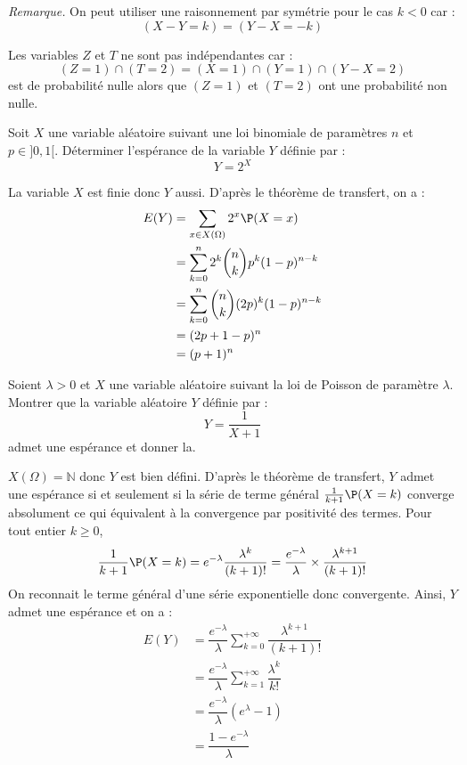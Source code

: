 \documentclass[a4paper,10pt]{report}
\begin{document}
\medskip

\noindent \textit{Remarque.} On peut utiliser une raisonnement par symétrie pour le cas $k <0$ car :
$$ (X-Y=k) = (Y-X=-k)$$

\medskip

\noindent Les variables $Z$ et $T$ ne sont pas indépendantes car :
$$ (Z=1) \cap (T=2) = (X =1) \cap (Y = 1) \cap (Y-X =2)$$
est de probabilité nulle alors que $(Z=1)$ et $(T=2)$ ont une probabilité non nulle.


\begin{Exa} Soit $X$ une variable aléatoire suivant une loi binomiale de paramètres $n$ et $p \in ]0,1[$. Déterminer l'espérance de la variable $Y$ définie par :
  \[
  Y = 2^X
  \]
\end{Exa}

\corr La variable $X$ est finie donc $Y$ aussi. D'après le théorème de transfert, on a :
\begin{align*}
E(Y) & = \sum_{x \in X(\Omega)} 2^x \P(X=x) \\
& = \sum_{k=0}^n 2^k \binom{n}{k} p^k (1-p)^{n-k} \\
& =  \sum_{k=0}^n \binom{n}{k} (2p)^k (1-p)^{n-k} \\
& = (2p+1-p)^n \\
& = (p+1)^n
\end{align*}

\begin{Exa} Soient $\lambda >0$ et $X$ une variable aléatoire suivant la loi de Poisson de paramètre $\lambda$. Montrer que la variable aléatoire $Y$ définie par :
$$ Y = \frac{1}{X+1}$$
admet une espérance et donner la.
\end{Exa}

\corr $X(\Omega)= \mathbb{N}$ donc $Y$ est bien défini. D'après le théorème de transfert, $Y$ admet une espérance si et seulement si la série de terme général $\tfrac{1}{k+1} \P(X=k)$ converge absolument ce qui équivalent à la convergence par positivité des termes. Pour tout entier $k \geq 0$,
$$ \dfrac{1}{k+1} \P(X=k) = e^{-\lambda} \dfrac{\lambda^k}{(k+1)!} = \dfrac{e^{-\lambda}}{\lambda} \times \dfrac{\lambda^{k+1}}{(k+1)!}$$
On reconnait le terme général d'une série exponentielle donc convergente. Ainsi, $Y$ admet une espérance et on a :
\begin{align*}
E(Y) & = \dfrac{e^{-\lambda}}{\lambda} \sum_{k=0}^{+ \infty}\dfrac{\lambda^{k+1}}{(k+1)!} \\
& = \dfrac{e^{-\lambda}}{\lambda} \sum_{k=1}^{+ \infty}\dfrac{\lambda^{k}}{k!} \\
& = \dfrac{e^{-\lambda}}{\lambda} (e^{\lambda}-1) \\
& = \dfrac{1- e^{-\lambda}}{\lambda}
\end{align*}
\end{document}
